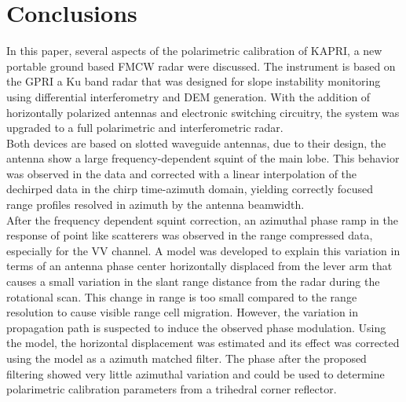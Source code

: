 \section{Conclusions}\label{sec:conclusions}
In this paper, several aspects of the polarimetric calibration of KAPRI, a new portable ground based FMCW radar were discussed. The instrument is
based on the GPRI\cite{werner_gpri_2012} a Ku band radar that was designed for slope instability monitoring using differential interferometry and DEM generation. With the addition of horizontally polarized antennas and electronic switching circuitry, the system was upgraded to a full polarimetric and interferometric radar.\\ Both  devices are based on slotted waveguide antennas, due to their design, the antenna show a large frequency-dependent squint of the main lobe. This behavior was observed in the data and corrected with a linear interpolation of the dechirped data in the chirp time-azimuth domain, yielding correctly focused range profiles resolved in azimuth by the antenna beamwidth.\\
After the frequency dependent squint correction, an azimuthal phase ramp in the response of point like scatterers was observed in the range compressed data, especially for the VV channel. A model was developed to explain this variation in terms of an antenna phase center horizontally displaced from the lever arm that causes a small variation in the slant range distance from the radar during the rotational scan. This change in range is too small compared to the range resolution to cause visible range cell migration. However, the variation in propagation path is suspected to induce the observed phase modulation. Using the model, the horizontal displacement was estimated and its effect was corrected using the model as a azimuth matched filter. The phase after the proposed filtering showed very little azimuthal variation and could be used to determine polarimetric calibration parameters from a trihedral corner reflector.\\
